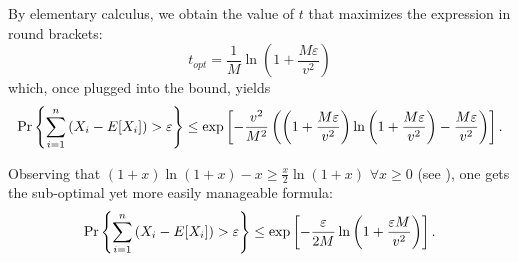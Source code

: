\documentclass[12pt]{article}
\begin{document}
By elementary calculus, we obtain the value of $t$ that maximizes the
expression in round brackets:
\[
t_{opt}=\frac{1}{M}\ln \left( 1+\frac{M\varepsilon }{v^{2}}\right) 
\]
which, once plugged into the bound, yields
\[
\Pr\left\{ \sum_{i=1}^{n}\left( X_{i}-E[X_{i}]\right) >\varepsilon \right\}
\leq \exp \left[ -\frac{v^{2}}{M^{2}}\left( \left( 1+\frac{M\varepsilon }{%
v^{2}}\right) \ln \left( 1+\frac{M\varepsilon }{v^{2}}\right) -\frac{%
M\varepsilon }{v^{2}}\right) \right]. 
\]

Observing that $\left( 1+x\right) \ln \left( 1+x\right) -x\geq \frac{x}{2}%
\ln \left( 1+x\right) $ $\forall x\geq 0$ (see ), one gets the
sub-optimal yet more easily manageable formula:
\[
\Pr\left\{ \sum_{i=1}^{n}\left( X_{i}-E[X_{i}]\right) >\varepsilon \right\}
\leq \exp \left[ -\frac{\varepsilon }{2M}\ln \left( 1+\frac{\varepsilon M}{%
v^{2}}\right) \right].
\]
\end{document}
